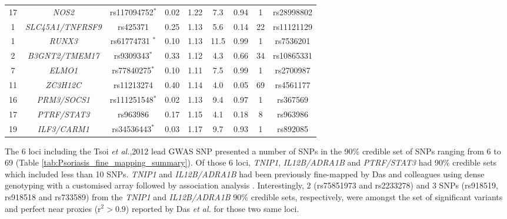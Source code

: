 \begin{landscape}
\begin{center}
\begin{longtable}[ht]{c c c c c c c c c}
17	& \textit{NOS2}&		   rs117094752$^{\ast}$  &		0.02 &	  1.22 &		7.3  &		0.94 &		1  &		rs28998802 \\
1	& \textit{SLC45A1/TNFRSF9}&		rs425371         &		0.25 &    1.13 &		5.6  &		0.14 &		22 &		rs11121129 \\
1	& \textit{RUNX3}&		     rs61774731 $^{\ast}$  &		0.10 &		1.13 &		11.5 &		0.99 &		1  &		rs7536201 \\
2	& \textit{B3GNT2/TMEM17}&		rs9309343$^{\ast}$ &		0.33 &		1.12 &		4.3  &		0.66 &		34 &		rs10865331 \\
7	& \textit{ELMO1}&		     rs77840275$^{\ast}$   &		0.10 &		1.11 &		7.5  &		0.99 &		1  &		rs2700987 \\
11	& \textit{ZC3H12C}&		 rs11213274            &		0.40 &		1.14 &		4.0  &		0.05 &		69 &		rs4561177 \\
16	& \textit{PRM3/SOCS1}& rs111251548$^{\ast}$  &		0.02 &		1.13 &		9.4  &		0.97 &		1  &		rs367569 \\
17	& \textit{PTRF/STAT3}& rs963986              &		0.17 &		1.15 &		4.1  &		0.18 &		8  &		rs963986 \\
19	& \textit{ILF3/CARM1}& rs34536443$^{\ast}$   &		0.03 &		1.17 &		9.7  &		0.93 &		1  &		rs892085 \\
\bottomrule
\end{longtable}
\end{center}
\end{landscape}


The 6 loci including the Tsoi \textit{et al.},2012 lead GWAS SNP presented a number of SNPs in the 90\% credible set of SNPs ranging from 6 to 69 (Table \ref{tab:Psoriasis_fine_mapping_summary}). Of those 6 loci, \textit{TNIP1}, \textit{IL12B/ADRA1B} and \textit{PTRF/STAT3} had 90\% credible sets which included less than 10 SNPs. \textit{TNIP1} and \textit{IL12B/ADRA1B} had been previously fine-mapped by Das and colleagues using dense genotyping with a customised array followed by association analysis \parencite{Das2014}. Interestingly, 2 (rs75851973 and rs2233278) and 3 SNPs (rs918519, rs918518 and rs733589) from the \textit{TNIP1} and \textit{IL12B/ADRA1B} 90\% credible sets, respectively, were amongst the set of significant variants and perfect near proxies (r$^2>0.9$) reported  by Das \textit{et al.} for those two same loci.



